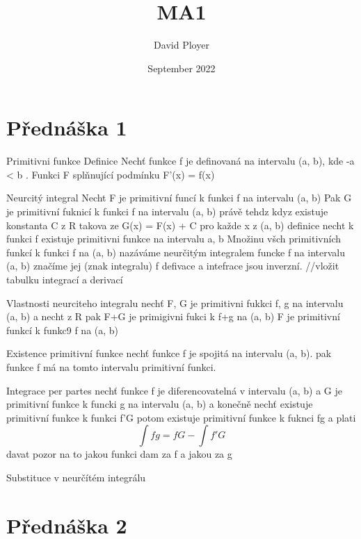 \documentclass{article}
\title{MA1}
\author{David Ployer}
\date{September 2022}
\begin{document}
\maketitle
\section{Přednáška 1}
Primitivni funkce 
	Definice 
		Nechť funkce f je definovaná na intervalu (a, b), kde -\infty \leq a < b \leq \infty . Funkci F splňnující podmínku 
		F'(x) = f(x)

Neurcitý integral 
	Necht F je primitivní funcí k funkci f na intervalu (a, b) Pak G je primitivní fuknicí k funkci f na intervalu (a, b) právě tehdz kdyz existuje konstanta C z R takova ze 
	G(x) = F(x) + C pro každe x z (a, b)
	definice 
		necht k funkci f existuje primitivni funkce na intervalu a, b Množinu všch primitivních funkcí k funkci f na (a, b) nazáváme neurčitým integralem funcke f na intervalu (a, b) značíme jej (znak integralu) f
	defivace a intefrace jsou inverzní.
	//vložit tabulku integrací a derivací

Vlastnosti neurciteho integralu
	nechť F, G je primitivni fukkci f, g na intervalu (a, b) a necht \alpha z R pak 
		F+G je primigivni fukci k f+g na (a, b)
		\alpha F je primitivní funkcí k funkc9 \alpha f na (a, b)
	
Existence primitivní funkce
	nechť funkce f je spojitá na intervalu (a, b). pak funkce f má na tomto intervalu primitivní funkci.

Integrace per partes 
	nechť funkce f je diferencovatelná v intervalu (a, b) a G je primitivní funkce k funcki g na intervalu (a, b) a konečně nechť existuje primitivní funkce k funkci f'G potom existuje primitivní funkce k fuknci fg a plati
$$\int fg = fG - \int f'G$$
	davat pozor na to jakou funkci dam za f a jakou za g

Substituce v neurčítém integrálu

\section{Přednáška 2}
\end{document}
